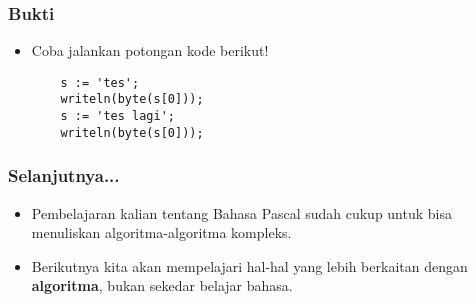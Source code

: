 \begin{frame}[fragile]
\frametitle{Bukti}
\begin{itemize}
  \item Coba jalankan potongan kode berikut!
  \begin{lstlisting}
    s := 'tes';
    writeln(byte(s[0]));
    s := 'tes lagi';
    writeln(byte(s[0]));
  \end{lstlisting}
\end{itemize}
\end{frame}

\begin{frame}
\frametitle{Selanjutnya...}
\begin{itemize}
  \item Pembelajaran kalian tentang Bahasa Pascal sudah cukup untuk bisa menuliskan algoritma-algoritma kompleks.
  \item Berikutnya kita akan mempelajari hal-hal yang lebih berkaitan dengan \textbf{algoritma}, bukan sekedar belajar bahasa.
\end{itemize}
\end{frame}


